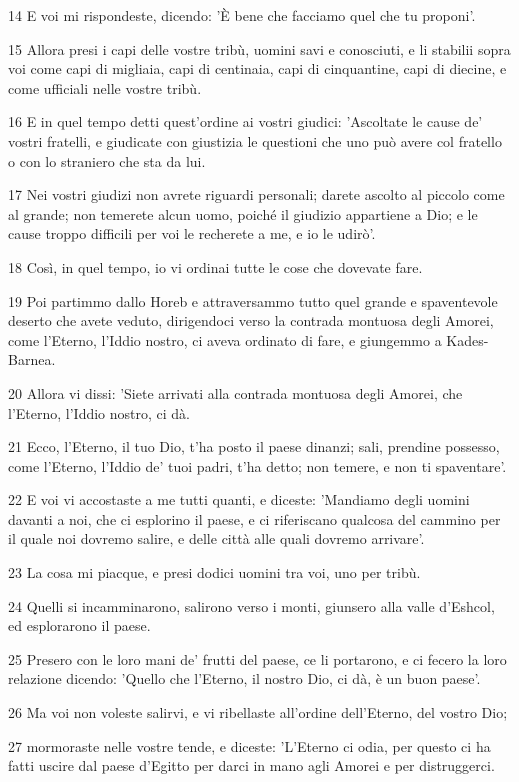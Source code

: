 \par 14 E voi mi rispondeste, dicendo: 'È bene che facciamo quel che tu proponi'.
\par 15 Allora presi i capi delle vostre tribù, uomini savi e conosciuti, e li stabilii sopra voi come capi di migliaia, capi di centinaia, capi di cinquantine, capi di diecine, e come ufficiali nelle vostre tribù.
\par 16 E in quel tempo detti quest'ordine ai vostri giudici: 'Ascoltate le cause de' vostri fratelli, e giudicate con giustizia le questioni che uno può avere col fratello o con lo straniero che sta da lui.
\par 17 Nei vostri giudizi non avrete riguardi personali; darete ascolto al piccolo come al grande; non temerete alcun uomo, poiché il giudizio appartiene a Dio; e le cause troppo difficili per voi le recherete a me, e io le udirò'.
\par 18 Così, in quel tempo, io vi ordinai tutte le cose che dovevate fare.
\par 19 Poi partimmo dallo Horeb e attraversammo tutto quel grande e spaventevole deserto che avete veduto, dirigendoci verso la contrada montuosa degli Amorei, come l'Eterno, l'Iddio nostro, ci aveva ordinato di fare, e giungemmo a Kades-Barnea.
\par 20 Allora vi dissi: 'Siete arrivati alla contrada montuosa degli Amorei, che l'Eterno, l'Iddio nostro, ci dà.
\par 21 Ecco, l'Eterno, il tuo Dio, t'ha posto il paese dinanzi; sali, prendine possesso, come l'Eterno, l'Iddio de' tuoi padri, t'ha detto; non temere, e non ti spaventare'.
\par 22 E voi vi accostaste a me tutti quanti, e diceste: 'Mandiamo degli uomini davanti a noi, che ci esplorino il paese, e ci riferiscano qualcosa del cammino per il quale noi dovremo salire, e delle città alle quali dovremo arrivare'.
\par 23 La cosa mi piacque, e presi dodici uomini tra voi, uno per tribù.
\par 24 Quelli si incamminarono, salirono verso i monti, giunsero alla valle d'Eshcol, ed esplorarono il paese.
\par 25 Presero con le loro mani de' frutti del paese, ce li portarono, e ci fecero la loro relazione dicendo: 'Quello che l'Eterno, il nostro Dio, ci dà, è un buon paese'.
\par 26 Ma voi non voleste salirvi, e vi ribellaste all'ordine dell'Eterno, del vostro Dio;
\par 27 mormoraste nelle vostre tende, e diceste: 'L'Eterno ci odia, per questo ci ha fatti uscire dal paese d'Egitto per darci in mano agli Amorei e per distruggerci.
